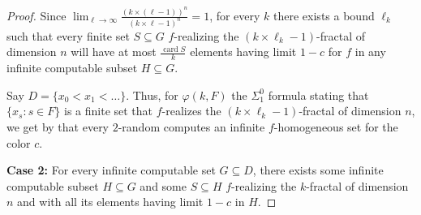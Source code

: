 \documentclass{article}
\numberwithin{theorem}{section}
\newcommand{\ludovic}[1]{\textcolor{blue}{#1}}
\newcommand{\quentin}[1]{\textcolor{green}{#1}}
\newcommand{\NN}[0]{\mathbb{N}}
\newcommand{\card}{\operatorname{card}}
\begin{document}
\begin{proof}

Since $\lim_{\ell \to \infty} \frac{(k\times (\ell - 1))^{n}}{(k\times \ell - 1)^{n}} = 1$, for every $k$ there exists a bound $\ell_k$ such that every finite set $S \subseteq G$ $f$-realizing the $(k\times \ell_k - 1)$-fractal of dimension $n$ will have at most $\frac{\card S}{k}$ elements having limit $1-c$ for $f$ in any infinite computable subset $H \subseteq G$.

Say $D = \{ x_0 < x_1 < \dots \}$.
Thus, for $\varphi(k,F)$ the $\Sigma_1^0$ formula stating that $\{ x_s : s \in F \}$ is a finite set that $f$-realizes the $(k\times \ell_k - 1)$-fractal of dimension $n$, we get by  that every $2$-random computes an infinite $f$-homogeneous set for the color $c$.%
\smallskip

\textbf{Case 2:} For every infinite computable set $G \subseteq D$, there exists some infinite computable subset $H \subseteq G$ and some $S \subseteq H$ $f$-realizing the $k$-fractal of dimension $n$ and with all its elements having limit $1-c$ in $H$.


\end{proof}
\end{document}
